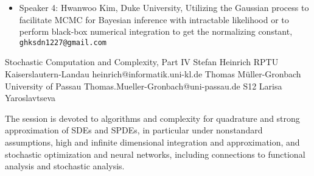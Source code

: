 \begin{session}
\begin{itemize}
 \item Speaker 4: Hwanwoo Kim, Duke University, Utilizing the Gaussian process to facilitate MCMC for Bayesian inference with intractable likelihood or to perform black-box numerical integration to get the normalizing constant, \texttt{ghksdn1227@gmail.com}
 \end{itemize}
 \begin{comment}
 If you would like to include references, please do so by creating a simple list numbered by [1], [2], [3], \ldots. See example below.
 Please do not use the \texttt{bibliography} environment or \texttt{bibtex} files.
 \begin{enumerate}
 \item[{[1]}] Niederreiter, Harald (1992). {\it Random number generation and quasi-Monte Carlo methods}. Society for Industrial and Applied Mathematics (SIAM).
 \item[{[2]}] Roberts, Gareth O, \& Rosenthal, Jeffrey S. (2002).  Optimal scaling for various Metropolis-Hastings algorithms, \textbf{16}(4), 351--367.
 \end{enumerate}
 Equations may be used if they are referenced. Please note that the equation numbers may be different (but will be cross-referenced correctly) in the final program book.
 \end{comment}
\end{session}



\clearpage

\begin{session}
 {Stochastic Computation and Complexity, Part IV}%
 {Stefan Heinrich}%
 {RPTU Kaiserslautern-Landau}%
 {heinrich@informatik.uni-kl.de}%
 {Thomas M\"uller-Gronbach}%
 {University of Passau}%
 {Thomas.Mueller-Gronbach@uni-passau.de}%
 {S12}%
 {Larisa Yaroslavtseva}%

 The session is devoted to algorithms and complexity for
 quadrature and strong approximation of SDEs and SPDEs, in particular under nonstandard assumptions,
 high and infinite dimensional integration and approximation, and
 stochastic optimization and neural networks,
 including connections to functional analysis and stochastic analysis.
 \medskip
\end{session}

